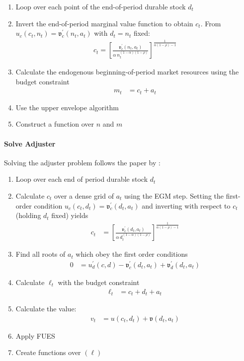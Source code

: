 \documentclass[\econtexMain]{subfiles}
\begin{document}
\begin{enumerate}
	\item Loop over each point of the end-of-period durable stock $d_t$
	\item Invert the end-of-period marginal value function to obtain $c_t$. From $u_c(c_t,n_t)=\mathfrak{v}^{'}_c(n_t,a_t)$ with $d_t=n_t$ fixed:\\
	\begin{align*}
		c_t = \left[\frac{\mathfrak{v}^{'}_c(n_t,a_t)}{\alpha\,n_t^{(1-\alpha)(1-\rho)}}\right]^{\frac{1}{\alpha(1-\rho)-1}}
	\end{align*}
	\item Calculate the endogenous beginning-of-period market resources using the budget constraint
	\begin{align*}
		m_t &= c_t + a_t
	\end{align*}
	\item Use the upper envelope algorithm
	\item Construct a function over $n$ and $m$
\end{enumerate}
	
	
	
\paragraph{Solve Adjuster}
Solving the adjuster problem follows the paper by \cite{Dobrescu2022-ii}:
\begin{enumerate}
	\item Loop over each end of period durable stock $d_t$
	\item Calculate $c_t$ over a dense grid of $a_t$ using the EGM step. Setting the first-order condition $u_c(c_t,d_t)=\mathfrak{v}^{'}_c(d_t,a_t)$ and inverting with respect to $c_t$ (holding $d_t$ fixed) yields\\
	\begin{align}
		c_t &= \left[\frac{\mathfrak{v}^{'}_c(d_t,a_t)}{\alpha\,d_t^{(1-\alpha)(1-\rho)}}\right]^{\frac{1}{\alpha(1-\rho)-1}}
	\end{align}
	\item Find all roots of $a_t$ which obey the first order conditions
	\begin{align}
		0 &= u^{'}_d(c, d) - \mathfrak{v}^{'}_c(d_t, a_t) + \mathfrak{v}^{'}_d(d_t, a_t)
	\end{align}
	\item Calculate $\ell_t$ with the budget constraint
	\begin{align}
		\ell_t &= c_t + d_t + a_t 
	\end{align}
	\item Calculate the value:
	\begin{align}
		v_t &= u(c_t, d_t) + \mathfrak{v}(d_t, a_t)
	\end{align}	
	\item Apply FUES
	\item Create functions over $(\ell)$
\end{enumerate}
	
\end{document}
